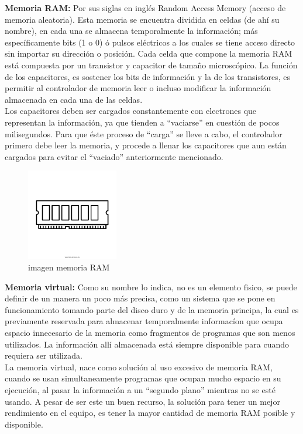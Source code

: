 \documentclass{article}
\begin{document}
\textbf{Memoria RAM:} Por sus siglas en inglés Random Access Memory (acceso de memoria aleatoria). Esta memoria se encuentra dividida en celdas (de ahí su nombre), en cada una se almacena temporalmente la información; más específicamente bits (1 o 0) ó pulsos eléctricos a los cuales se tiene acceso directo sin importar su dirección o posición.
Cada celda que compone la memoria RAM está compuesta por un transistor y capacitor de tamaño microscópico.
La función de los capacitores, es sostener los bits de información y la de los transistores, es permitir al controlador de memoria leer o incluso modificar la información almacenada en cada una de las celdas.\\
\noindent
Los capacitores deben ser cargados constantemente con electrones que representan la información, ya que tienden a ``vaciarse'' en cuestión de pocos milisegundos. Para que éste proceso de ``carga'' se lleve a cabo, el controlador primero debe leer la memoria, y procede a llenar los capacitores que aun están cargados para evitar el ``vaciado'' anteriormente mencionado.\\
%
\begin{figure}[h]
\includegraphics[width=4cm]{memoriaRAM.png}
\centering
\caption{imagen memoria RAM}
\label{fig:memoriaRAM}
\end{figure}

\textbf{Memoria virtual:} Como su nombre lo indica, no es un elemento fisico, se puede definir de un manera un poco más precisa, como un sistema que se pone en funcionamiento tomando parte del disco duro y de la memoria principa, la cual es previamente reservada para almacenar temporalmente informacíon que ocupa espacio innecesario de la memoria como fragmentos de programas que son menos utilizados. La información allí almacenada está siempre disponible para cuando requiera ser utilizada.\\

\noindent
La memoria virtual, nace como solución al uso excesivo de memoria RAM, cuando se usan simultaneamente programas que ocupan mucho espacio en su ejecución, al pasar la información a un ``segundo plano'' mientras no se esté usando.
A pesar de ser este un buen recurso, la solución para tener un mejor rendimiento en el equipo, es tener la mayor cantidad de memoria RAM posible y disponible.\\
\end{document}
